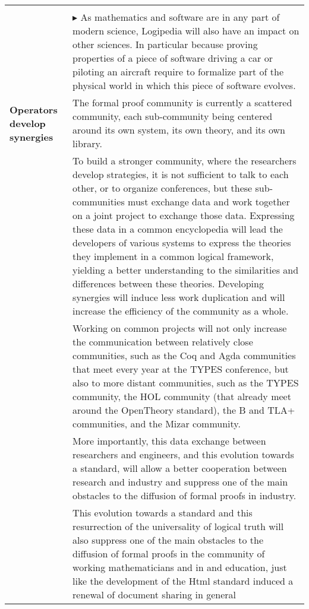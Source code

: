 \begin{longtable}{|p{}|p{}|}
&\\
&
$\blacktriangleright$ As mathematics and software are in any part of modern science,
  Logipedia will also have an impact on other sciences. In
  particular because proving properties of a piece of software driving
  a car or piloting an aircraft require to formalize part of the
  physical world in which this piece of software evolves.
\\
\hline
{\bf Operators develop synergies}
&
The formal proof community is currently a scattered community, each
sub-community being centered around its own system, its own theory,
and its own library.\\
&
\hspace{0.4cm}
To build a stronger community, where the researchers develop
strategies, it is not sufficient to talk to each other, or to organize
conferences, but these sub-communities must exchange data and work
together on a joint project to exchange those data.
Expressing these data in a common encyclopedia will
lead the developers of various systems to express the theories they
implement in a common logical framework, yielding a better understanding
to the similarities and differences between these theories.
Developing synergies will induce less work duplication and will increase
the efficiency of the community as a whole.\\
&
\hspace{0.4cm}
Working on common projects will not only increase the communication
between relatively close communities, such as the Coq and 
  Agda communities that meet every year at the TYPES conference, but
also to more distant communities, such as the TYPES community, the HOL
community (that already meet around the OpenTheory standard),
the B and TLA+ communities, and the Mizar community.\\
&
\hspace{0.4cm}
More importantly, this data exchange between researchers and
engineers, and this evolution towards a standard, will allow a better
cooperation between research and industry and suppress one of the main
obstacles to the diffusion of formal proofs in industry.\\
&
\hspace{0.4cm}
This evolution towards a standard and this resurrection of the
universality of logical truth will also suppress one of the main
obstacles to the diffusion of formal proofs in the community of
working mathematicians and in and education, just like the development
of the Html standard induced a renewal of document sharing in general

\end{longtable}
